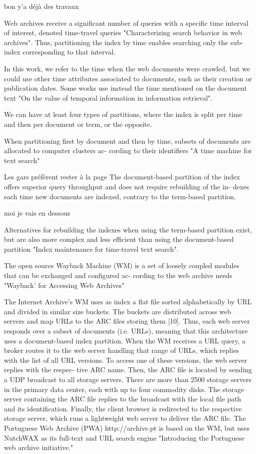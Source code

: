 \documentclass[symmetric,justified,marginals=raggedouter]{tufte-book}
\begin{document}
bon y'a déjà des travaux 

Web archives receive a significant number of queries with a
specific time interval of interest, denoted time-travel queries
"Characterizing search
behavior in web archives".  Thus, partitioning the index by time enables searching
only the sub-index corresponding to that interval.

In this
work,  we  refer  to  the  time  when  the  web  documents  were
crawled, but we could use other time attributes associated
to  documents,  such  as  their  creation  or  publication  dates.
Some works use instead the time mentioned on the document
text "On the
value of temporal information in information retrieval".

We can have at least four types of partitions, where the
index is split per time and then per document or term, or the
opposite.

When  partitioning  first  by  document  and  then  by  time,
subsets of documents are allocated to computer clusters ac-
cording to their identifiers "A time machine for text search"

Les gars préfèrent rester à la page 
The document-based partition of the index offers superior
query throughput and does not require rebuilding of the in-
dexes  each  time  new  documents  are  indexed,  contrary  to
the term-based partition. 

moi je vais en dessous 

Alternatives  for  rebuilding  the  indexes
when using the term-based partition exist, but are also more
complex  and  less  efficient  than  using  the  document-based
partition "Index maintenance for time-travel text
search".

The open source Wayback Machine (WM) is a set of loosely
coupled modules that can be exchanged and configured ac-
cording  to  the  web  archive  needs  "Wayback’ for Accessing Web Archives"

The Internet Archive’s WM uses as index a flat file sorted
alphabetically by URL and divided in similar size buckets.
The  buckets  are  distributed  across  web  servers  and  map
URLs to the ARC files storing them [10].  Thus, each web
server  responds  over  a  subset  of  documents  (i.e.   URLs),
meaning that this architecture uses a document-based index
partition.   When the WM receives  a URL query,  a broker
routes  it  to  the  web  server  handling  that  range  of  URLs,
which  replies  with  the  list  of  all  URL  versions.   To  access
one of these versions, the web server replies with the respec-
tive ARC name.  Then, the ARC file is located by sending a
UDP broadcast to all storage servers.  There are more than
2500 storage servers in the primary data center, each with up
to four commodity disks.  The storage server containing the
ARC file replies to the broadcast with the local file path and
its identification.  Finally, the client browser is redirected to
the respective storage server, which runs a lightweight web
server to deliver the ARC file.
The  Portuguese  Web  Archive  (PWA)
http://archive.pt
is  based  on  the
WM, but uses NutchWAX as its full-text and URL search
engine "Introducing the Portuguese web archive initiative."
\end{document}
